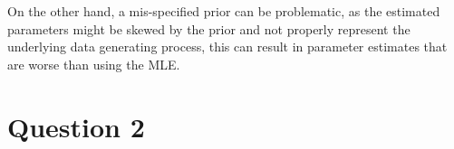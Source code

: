 \documentclass[12pt]{article}
\begin{document}
\begin{enumerate}
On the other hand, a mis-specified prior can be problematic, as the estimated parameters might be skewed by the prior and not properly represent the underlying data generating process, this can result in parameter estimates that are worse than using the MLE.







\end{enumerate}

\newpage
\section*{Question 2}
\end{document}
